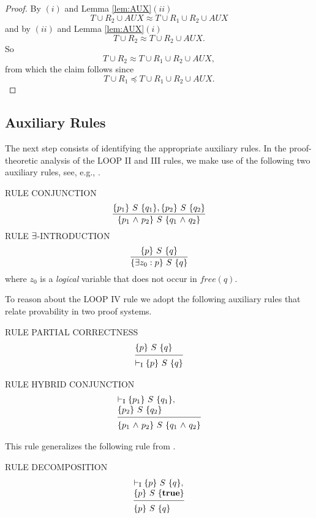 \documentclass[manuscript, screen, review]{acmart}
\newcommand{\AUX}{\mathit{AUX}}
\begin{document}
\begin{proof}
  By $(i)$ and Lemma \ref{lem:AUX}$(ii)$
\[
T \cup R_2 \cup \AUX \approx T \cup R_1 \cup R_2 \cup \AUX
\]
and by $(ii)$ and Lemma \ref{lem:AUX}$(i)$
\[
T \cup R_2 \approx T \cup R_2 \cup \AUX.
\]
So 
\[
T \cup R_2 \approx T \cup R_1 \cup R_2 \cup \AUX,
\]
from which the claim follows since
\[
  T \cup R_1 \preceq T \cup R_1 \cup R_2 \cup \AUX.
\]
\end{proof}


\subsection{Auxiliary Rules}
\label{subsec:aux}

The next step consists of identifying the appropriate auxiliary rules. 
In the proof-theoretic analysis of the LOOP II and III rules, we make
use of the following two auxiliary rules, see, e.g., \cite{ABO09}.
\III

\NI
RULE \label{rul:conj} CONJUNCTION
\[ 
 \frac{ \mbox{$\{{p_1}\}\ {S}\ \{{q_1}\}$}, \mbox{$\{{p_2}\}\ {S}\ \{{q_2}\}$}     }
      { \mbox{$\{{p_1 \mbox{$\ \wedge\ $} p_2}\}\ {S}\ \{{q_1 \mbox{$\ \wedge\ $} q_2}\}$}         } 
\]
\NI
RULE \label{rul:intro} $\mbox{$\exists$}$-INTRODUCTION 
\[ 
 \frac{ \mbox{$\{{p}\}\ {S}\ \{{q}\}$}          }
      { \mbox{$\{{\mbox{$\exists$} z_0:p}\}\ {S}\ \{{q}\}$}    }
\]
\NI
where $z_0$ is a \emph{logical} variable that does not occur  in $\mathit{free}(q)$.
\III

To reason about the LOOP IV rule we adopt the following auxiliary
rules that relate provability in two proof systems.
\III

\NI
RULE PARTIAL CORRECTNESS
\[
 \begin{array}{l}
   \HT{p}{S}{q}\\
  [-\medskipamount]
  \hrulefill                         \\
  \vdash_{\rm{I}} \HT{p}{S}{q}
  \end{array}
\]

\III

\noindent
RULE HYBRID CONJUNCTION
\[
 \begin{array}{l}
  \vdash_{\rm{I}} \HT{p_1}{S}{q_1},   \\
  \HT{p_2}{S}{q_2}                    \\
  [-\medskipamount]
  \hrulefill                          \\
  \HT{p_1 \A p_2}{S}{q_1 \A q_2}
 \end{array}
\]

This rule generalizes the following rule from \cite{ABO09}.
\III

\noindent
RULE DECOMPOSITION
\[
 \begin{array}{l}
  \vdash_{\rm{I}} \HT{p}{S}{q},      \\
  \HT{p}{S}{\T}                      \\
  [-\medskipamount]
  \hrulefill                         \\
  \HT{p}{S}{q}
  \end{array}
\]
\end{document}
